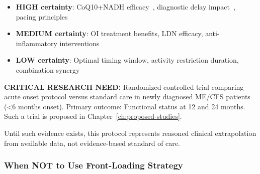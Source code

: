 \begin{itemize}
    \item \textbf{HIGH certainty}: CoQ10+NADH efficacy~\cite{CastroMarrero2021fatigue}, diagnostic delay impact~\cite{CastroMarrero2022prognosis}, pacing principles
    \item \textbf{MEDIUM certainty}: OI treatment benefits, LDN efficacy, anti-inflammatory interventions
    \item \textbf{LOW certainty}: Optimal timing window, activity restriction duration, combination synergy
\end{itemize}

\textbf{CRITICAL RESEARCH NEED:} Randomized controlled trial comparing acute onset protocol versus standard care in newly diagnosed ME/CFS patients (<6 months onset). Primary outcome: Functional status at 12 and 24 months. Such a trial is proposed in Chapter~\ref{ch:proposed-studies}.

Until such evidence exists, this protocol represents reasoned clinical extrapolation from available data, not evidence-based standard of care.

\subsubsection{When NOT to Use Front-Loading Strategy}

